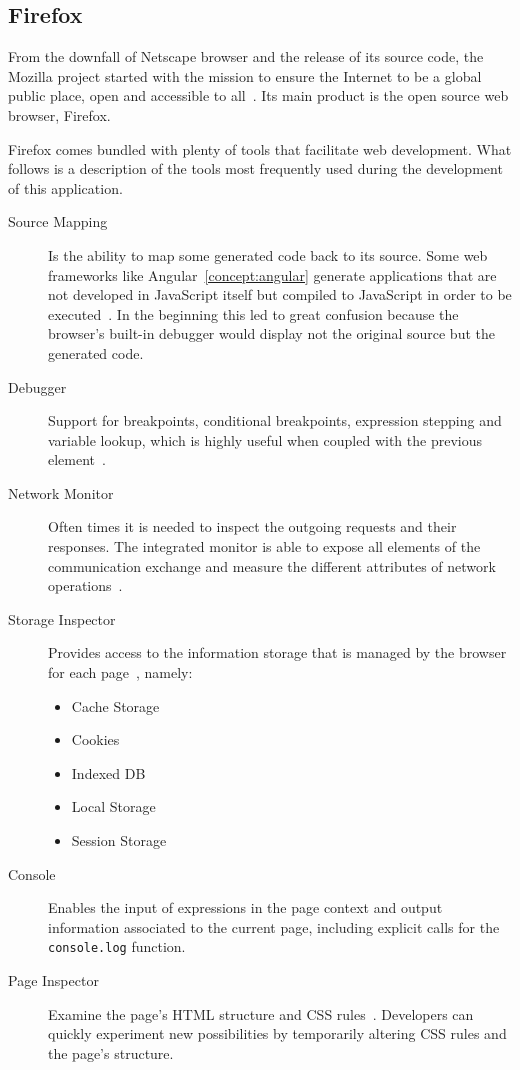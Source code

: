 \subsection{Firefox}
From the downfall of Netscape browser and the release of its source code, the Mozilla project started with the mission to ensure the Internet to be a global public place, open and accessible to all~\cite{firemission}. Its main product is the open source web browser, Firefox.

Firefox comes bundled with plenty of tools that facilitate web development. What follows is a description of the tools most frequently used during the development of this application.

\begin{description}
\item [Source Mapping] Is the ability to map some generated code back to its source. Some web frameworks like Angular~\ref{concept:angular} generate applications that are not developed in JavaScript itself but compiled to JavaScript in order to be executed~\cite{srcmapping}. In the beginning this led to great confusion because the browser's built-in debugger would display not the original source but the generated code.
\item [Debugger] Support for breakpoints, conditional breakpoints, expression stepping and variable lookup, which is highly useful when coupled with the previous element~\cite{dbgmodernweb}.
\item [Network Monitor] Often times it is needed to inspect the outgoing requests and their responses. The integrated monitor is able to expose all elements of the communication exchange and measure the different attributes of network operations~\cite{networkmon}.
\item [Storage Inspector] Provides access to the information storage that is managed by the browser for each page~\cite{storageinspector}, namely:

  \begin{itemize}
  \item Cache Storage
  \item Cookies
  \item Indexed \gls{DB}
  \item Local Storage
  \item Session Storage
  \end{itemize}
\item [Console] Enables the input of expressions in the page context and output information associated to the current page, including explicit calls for the \texttt{console.log} function.
\item [Page Inspector] Examine the page's \gls{HTML} structure and \gls{CSS} rules~\cite{inspector}. Developers can quickly experiment new possibilities by temporarily altering \gls{CSS} rules and the page's structure.
\end{description}

